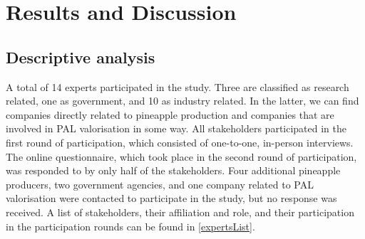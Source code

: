 \section{Results and Discussion}

        
\subsection{Descriptive analysis}
\label{descriptiveFCM}

A total of 14 experts participated in the study. Three are classified as research related, one as government, and 10 as industry related. In the latter, we can find companies directly related to pineapple production and companies that are involved in PAL valorisation in some way. All stakeholders participated in the first round of participation, which consisted of one-to-one, in-person interviews. The online questionnaire, which took place in the second round of participation, was responded to by only half of the stakeholders. Four additional pineapple producers, two government agencies, and one company related to PAL valorisation were contacted to participate in the study, but no response was received. A list of stakeholders, their affiliation and role, and their participation in the participation rounds can be found in \cref{expertsList}.

